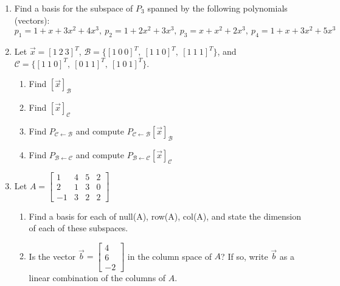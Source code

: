 \documentclass[12pt]{article}
\newcommand {\DS} [1] {${\displaystyle #1}$}
\begin{document}
\begin{enumerate}

\item Find a basis for the subspace of $P_3$ spanned by the following polynomials (vectors):
$$
p_1 = 1 + x + 3x^2 + 4x^3, \ p_2 = 1 + 2x^2 + 3x^3, \ p_3 = x + x^2 + 2x^3, \ p_4 = 1 + x + 3x^2 + 5x^3
$$


\item
Let $\vec{x} = [1 \ 2 \ 3]^T$, $\mathcal{B} = \{[1 \ 0 \ 0]^T, \  [1 \ 1 \ 0]^T, \ [1 \ 1 \ 1]^T \}$, and $\mathcal{C} = \{[1 \ 1 \ 0]^T, \  [0 \ 1 \ 1]^T, \ [1 \ 0 \ 1]^T \}$.
\begin{enumerate}
\item Find $[\vec{x}]_{\mathcal{B}}$ 
\item Find $[\vec{x}]_{\mathcal{C}}$ 
\item Find $P_{\mathcal{C} \leftarrow \mathcal{B}}$ and compute $P_{\mathcal{C} \leftarrow \mathcal{B}}[\vec{x}]_{\mathcal{B}}$ 
\item Find $P_{\mathcal{B} \leftarrow \mathcal{C}}$ and compute $P_{\mathcal{B} \leftarrow \mathcal{C}}[\vec{x}]_{\mathcal{C}}$
\end{enumerate}

\item Let \DS{ A = \begin{bmatrix}
1 & 4 & 5 & 2 \\
2 & 1 & 3 & 0 \\
-1 & 3 & 2 & 2
\end{bmatrix}}
\begin{enumerate}
\item Find a basis for each of null(A), row(A), col(A), and state the dimension of each of these subspaces.
\item Is the vector \DS {\vec{b} = \begin{bmatrix}
4 \\
6 \\
-2
\end{bmatrix}} in the column space of $A$? If so, write $\vec{b}$ as a linear combination of the columns of $A$.
\end{enumerate}
\end{enumerate}
\end{document}

